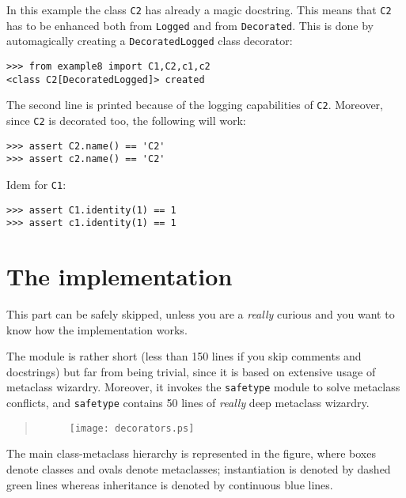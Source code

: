 \documentclass[11pt,english]{article}
\begin{document}
In this example the class \texttt{C2} has already a magic docstring. This means that
\texttt{C2} has to be enhanced both from \texttt{Logged} and from \texttt{Decorated}.
This is done by automagically creating a \texttt{DecoratedLogged} class
decorator:
\begin{verbatim}>>> from example8 import C1,C2,c1,c2 
<class C2[DecoratedLogged]> created\end{verbatim}

The second line is printed because of the logging capabilities of \texttt{C2}.
Moreover, since \texttt{C2} is decorated too, the following will work:
\begin{verbatim}>>> assert C2.name() == 'C2'
>>> assert c2.name() == 'C2' \end{verbatim}

Idem for \texttt{C1}:
\begin{verbatim}>>> assert C1.identity(1) == 1
>>> assert c1.identity(1) == 1 \end{verbatim}



\hypertarget{the-implementation}{}
\section*{The implementation}

This part can be safely skipped, unless you are a \emph{really} curious and
you want to know how the implementation works.

The module is rather short (less than 150 lines if you skip comments and
docstrings) but far from being trivial, since it is based on extensive 
usage of metaclass wizardry. Moreover,
it invokes the \texttt{safetype} module to solve metaclass conflicts, and
\texttt{safetype} contains 50 lines of \emph{really} deep metaclass wizardry.
\begin{quote}
\begin{figure}

\texttt{[image: decorators.ps]}
\end{figure}
\end{quote}

The main class-metaclass hierarchy is represented in the figure, where
boxes denote classes and ovals denote metaclasses; instantiation is
denoted by dashed green lines whereas inheritance is denoted by continuous
blue lines.
\end{document}
